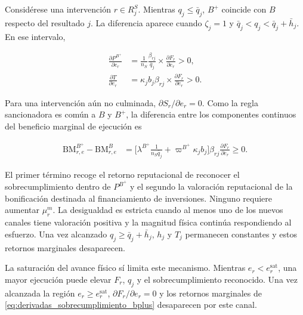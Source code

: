Considérese una intervención \(r\in R_j^{S}\). Mientras \(q_j\leq\bar q_j\), \(B^{+}\) coincide con \(B\) respecto del resultado \(j\). La diferencia aparece cuando \(\zeta_j=1\) y \(\bar q_j<q_j<\bar q_j+\bar h_j\). En ese intervalo,

\begin{subequations}
\label{eq:derivadas_sobrecumplimiento_bplus}
\begin{align}
\frac{\partial P^{B^{+}}}{\partial e_r}
&=
\frac{1}{n_S}
\frac{\beta_{rj}}{\bar q_j}
\times
\frac{\partial F_r}{\partial e_r}
>0,
\label{eq:derivada_p_bplus}
\\
\frac{\partial T}{\partial e_r}
&=
\kappa_j b_j
\beta_{rj}
\times
\frac{\partial F_r}{\partial e_r}
>0.
\label{eq:derivada_premio_bplus}
\end{align}
\end{subequations}

Para una intervención aún no culminada, \(\partial S_r/\partial e_r=0\). Como la regla sancionadora es común a \(B\) y \(B^{+}\), la diferencia entre los componentes continuos del beneficio marginal de ejecución es

\begin{equation}
\label{eq:incentivo_marginal_bplus}
\begin{aligned}
\mathrm{BM}_{r,e}^{B^{+}}
-
\mathrm{BM}_{r,e}^{B}
&=
\Biggl[
\lambda^{B^{+}}
\frac{1}{n_S\bar q_j}
+
\varpi^{B^{+}}
\kappa_j b_j
\Biggr]
\beta_{rj}
\frac{\partial F_r}{\partial e_r}
\geq
0.
\end{aligned}
\end{equation}

El primer término recoge el retorno reputacional de reconocer el sobrecumplimiento dentro de \(P^{B^{+}}\) y el segundo la valoración reputacional de la bonificación destinada al financiamiento de inversiones. Ninguno requiere aumentar \(\mu_r^m\). La desigualdad es estricta cuando al menos uno de los nuevos canales tiene valoración positiva y la magnitud física continúa respondiendo al esfuerzo. Una vez alcanzado \(q_j\geq\bar q_j+\bar h_j\), \(h_j\) y \(T_j\) permanecen constantes y estos retornos marginales desaparecen.

La saturación del avance físico sí limita este mecanismo. Mientras \(e_r<e_r^{\mathrm{sat}}\), una mayor ejecución puede elevar \(F_r\), \(q_j\) y el sobrecumplimiento reconocido. Una vez alcanzada la región \(e_r\geq e_r^{\mathrm{sat}}\), \(\partial F_r/\partial e_r=0\) y los retornos marginales de \eqref{eq:derivadas_sobrecumplimiento_bplus} desaparecen por este canal.

